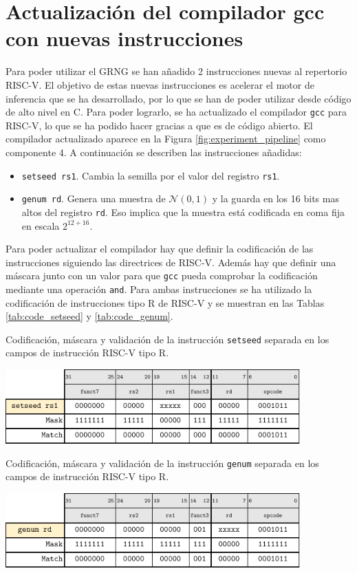 \section{Actualización del compilador gcc con nuevas instrucciones}

Para poder utilizar el GRNG se han añadido 2 instrucciones nuevas al repertorio RISC-V. El objetivo de estas nuevas instrucciones es acelerar el motor de inferencia que se ha desarrollado, por lo que se han de poder utilizar desde código de alto nivel en C. Para poder lograrlo, se ha actualizado el compilador \texttt{gcc} para RISC-V, lo que se ha podido hacer gracias a que es de código abierto. El compilador actualizado aparece en la Figura \ref{fig:experiment_pipeline} como componente 4. A continuación se describen las instrucciones añadidas:
\begin{itemize}
    \item \texttt{setseed rs1}. Cambia la semilla por el valor del registro \texttt{rs1}.
    \item \texttt{genum rd}. Genera una muestra de $\mathcal{N}(0,1)$ y la guarda en los 16 bits mas altos del registro \texttt{rd}. Eso implica que la muestra está codificada en coma fija en escala $2^{12 + 16}$.
\end{itemize}

Para poder actualizar el compilador hay que definir la codificación de las instrucciones siguiendo las directrices de RISC-V. Además hay que definir una máscara junto con un valor para que \texttt{gcc} pueda comprobar la codificación mediante una operación \texttt{and}. Para ambas instrucciones se ha utilizado la codificación de instrucciones tipo R de RISC-V y se muestran en las Tablas \ref{tab:code_setseed} y \ref{tab:code_genum}.

\begin{table}[h]
    \centering
    \caption{Codificación, máscara y validación de la instrucción \texttt{setseed} separada en los campos de instrucción RISC-V tipo R.}
    \label{tab:code_setseed}
    \includegraphics[width=0.85\textwidth]{root/Imagenes/riscv_ext/code_setseed.pdf}
\end{table}

\begin{table}[h]
    \centering
    \caption{Codificación, máscara y validación de la instrucción \texttt{genum} separada en los campos de instrucción RISC-V tipo R.}
    \label{tab:code_genum}
    \includegraphics[width=0.85\textwidth]{root/Imagenes/riscv_ext/code_genum.pdf}
\end{table}

